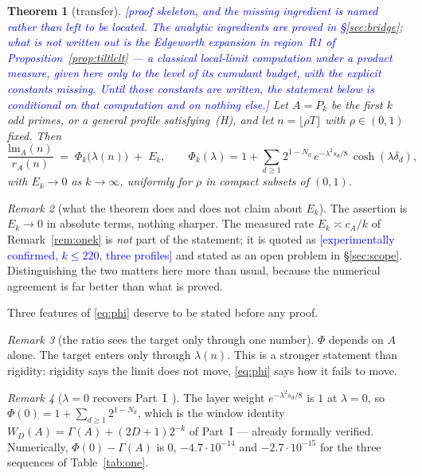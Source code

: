 \documentclass[11pt,a4paper]{article}
\theoremstyle{plain}
\newtheorem{theorem}{Theorem}[section]
\theoremstyle{definition}
\theoremstyle{remark}
\newtheorem{remark}[theorem]{Remark}
\newcommand{\lm}{\mathrm{lm}}
\newcommand{\STATUS}[1]{\textcolor{blue}{\textsf{[#1]}}}
\begin{document}
\begin{theorem}[transfer]\label{thm:transfer}
\STATUS{proof skeleton, and the missing ingredient is named rather than left to be located.
The analytic ingredients are proved in \S\ref{sec:bridge}; what is \emph{not} written out is
the Edgeworth expansion in region~R1 of Proposition~\ref{prop:tiltlclt} --- a classical
local-limit computation under a product measure, given here only to the level of its cumulant
budget, with the explicit constants missing. Until those constants are written, the statement
below is conditional on that computation and on nothing else.}
Let $A=P_k$ be the first $k$ odd primes, or a general profile satisfying~\textup{(H)}, and let
$n=\lfloor\rho T\rfloor$ with $\rho\in(0,1)$ fixed. Then
\begin{equation}\label{eq:phi}
  \frac{\lm_A(n)}{r_A(n)}\;=\;\Phi_k\bigl(\lambda(n)\bigr)\;+\;E_k,
  \qquad
  \Phi_k(\lambda)=1+\sum_{d\ge1}2^{1-N_d}\,
     e^{-\lambda^{2}s_d/8}\,\cosh(\lambda\delta_d),
\end{equation}
with $E_k\to0$ as $k\to\infty$, uniformly for $\rho$ in compact subsets of $(0,1)$.
\end{theorem}

\begin{remark}[what the theorem does and does not claim about $E_k$]\label{rem:whatEk}
The assertion is $E_k\to0$ in absolute terms, nothing sharper. The measured rate
$E_k\asymp c_A/k$ of Remark~\ref{rem:onek} is \emph{not} part of the statement; it is quoted as
\STATUS{experimentally confirmed, $k\le220$, three profiles} and stated as an open problem in
\S\ref{sec:scope}. Distinguishing the two matters here more than usual, because the numerical
agreement is far better than what is proved.
\end{remark}

Three features of \eqref{eq:phi} deserve to be stated before any proof.

\begin{remark}[the ratio sees the target only through one number]
$\Phi$ depends on $A$ alone. The target enters only through $\lambda(n)$. This is a stronger
statement than rigidity: rigidity says the limit does not move, \eqref{eq:phi} says how it
fails to move.
\end{remark}

\begin{remark}[$\lambda=0$ recovers Part~I~\cite{P1}]\label{rem:lam0}
The layer weight $e^{-\lambda^2s_d/8}$ is $1$ at $\lambda=0$, so
$\Phi(0)=1+\sum_{d\ge1}2^{1-N_d}$, which is the window identity
$W_D(A)=\Gamma(A)+(2D+1)2^{-k}$ of Part~I --- already formally verified.
Numerically, $\Phi(0)-\Gamma(A)$ is $0$, $-4.7\cdot10^{-14}$ and $-2.7\cdot10^{-15}$ for the
three sequences of Table~\ref{tab:one}.
\end{remark}
\end{document}
